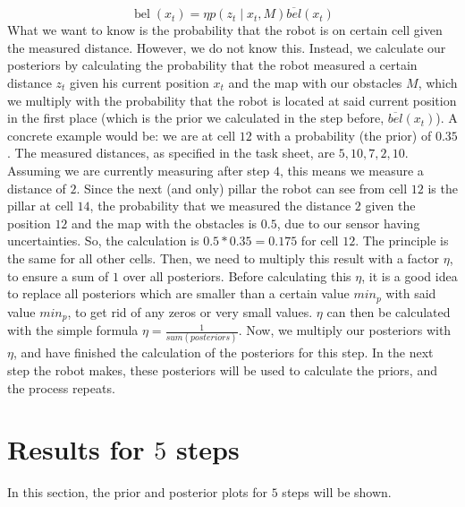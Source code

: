 \documentclass[11pt]{article}
\begin{document}
    \begin{equation}\label{eq:posteq}
    \operatorname{bel}\left(x_{t}\right)=\eta p\left(z_{t} \mid x_{t}, M\right) \overline{b e l}\left(x_{t}\right)
    \end{equation}
    What we want to know is the probability that the robot is on certain cell given the measured distance.
    However, we do not know this.
    Instead, we calculate our posteriors by calculating the probability that the robot measured a certain distance $z_{t}$ given his current position $x_{t}$ and the map with our obstacles $M$, which we multiply with the probability that the robot is located at said current position in the first place (which is the prior we calculated in the step before, $\overline{b e l}\left(x_{t}\right)$).
    A concrete example would be: we are at cell $12$ with a probability (the prior) of $0.35$.
    The measured distances, as specified in the task sheet, are $5, 10 , 7 , 2, 10$.
    Assuming we are currently measuring after step $4$, this means we measure a distance of $2$.
    Since the next (and only) pillar the robot can see from cell $12$ is the pillar at cell $14$, the probability that we measured the distance $2$ given the position $12$ and the map with the obstacles is $0.5$, due to our sensor having uncertainties.
    So, the calculation is $0.5 * 0.35 = 0.175$ for cell $12$.\newline
    The principle is the same for all other cells.
    Then, we need to multiply this result with a factor $\eta$, to ensure a sum of $1$ over all posteriors.
    Before calculating this $\eta$, it is a good idea to replace all posteriors which are smaller than a certain value $min_{p}$ with said value $min_{p}$, to get rid of any zeros or very small values.
    $\eta$ can then be calculated with the simple formula $\eta = \frac{1}{sum(posteriors)}$.
    Now, we multiply our posteriors with $\eta$, and have finished the calculation of the posteriors for this step.\newline
    In the next step the robot makes, these posteriors will be used to calculate the priors, and the process repeats.

        \section{Results for $5$ steps}\label{sec:results}
        In this section, the prior and posterior plots for $5$ steps will be shown.
\end{document}
